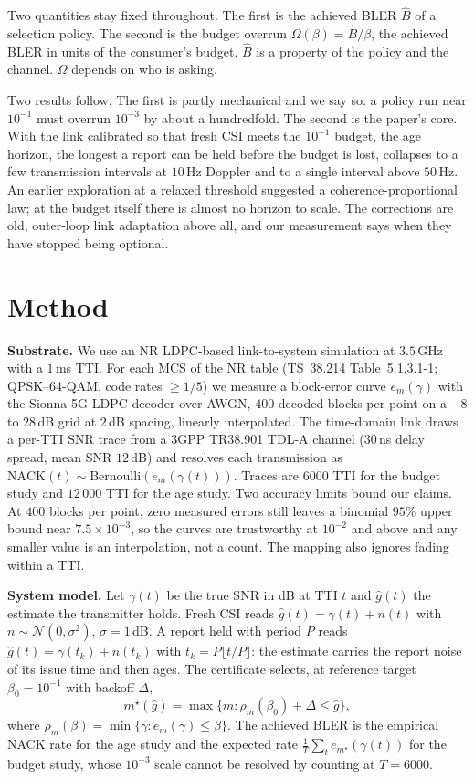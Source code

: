 \documentclass[conference]{IEEEtran}
\begin{document}
Two quantities stay fixed throughout. The first is the achieved BLER
$\widehat{B}$ of a selection policy. The second is the budget overrun
$\Omega(\beta)=\widehat{B}/\beta$, the achieved BLER in units of the consumer's
budget. $\widehat{B}$ is a property of the policy and the channel. $\Omega$
depends on who is asking.

Two results follow. The first is partly mechanical and we say so: a policy run
near $10^{-1}$ must overrun $10^{-3}$ by about a hundredfold. The second is the
paper's core. With the link calibrated so that fresh CSI meets the $10^{-1}$
budget, the age horizon, the longest a report can be held before the budget is
lost, collapses to a few transmission intervals at $10$\,Hz Doppler and to a
single interval above $50$\,Hz. An earlier exploration at a relaxed threshold
suggested a coherence-proportional law; at the budget itself there is almost no
horizon to scale. The corrections are old, outer-loop link adaptation above all,
and our measurement says when they have stopped being optional.

\section{Method}
\label{sec:method}
\textbf{Substrate.} We use an NR LDPC-based link-to-system simulation at
$3.5$\,GHz with a $1$\,ms TTI. For each MCS of the NR table (TS~38.214
Table~5.1.3.1-1; QPSK--64-QAM, code rates $\ge 1/5$) we measure a block-error
curve $e_m(\gamma)$ with the Sionna 5G LDPC decoder \cite{sionna} over AWGN,
$400$ decoded blocks per point on a $-8$ to $28$\,dB grid at $2$\,dB spacing,
linearly interpolated. The time-domain link draws a per-TTI SNR trace from a
3GPP TR38.901 TDL-A channel ($30$\,ns delay spread, mean SNR $12$\,dB) and
resolves each transmission as
$\mathrm{NACK}(t)\sim\mathrm{Bernoulli}(e_{m}(\gamma(t)))$. Traces are $6000$
TTI for the budget study and $12\,000$ TTI for the age study. Two accuracy
limits bound our claims. At $400$ blocks per point, zero measured errors still
leaves a binomial $95\%$ upper bound near $7.5\times10^{-3}$, so the curves are
trustworthy at $10^{-2}$ and above and any smaller value is an interpolation,
not a count. The mapping also ignores fading within a TTI.

\textbf{System model.} Let $\gamma(t)$ be the true SNR in dB at TTI $t$ and
$\hat{g}(t)$ the estimate the transmitter holds. Fresh CSI reads
$\hat{g}(t)=\gamma(t)+n(t)$ with $n\sim\mathcal{N}(0,\sigma^2)$,
$\sigma=1$\,dB. A report held with period $P$ reads
$\hat{g}(t)=\gamma(t_k)+n(t_k)$ with $t_k=P\lfloor t/P\rfloor$: the estimate
carries the report noise of its issue time and then ages. The certificate
selects, at reference target $\beta_0=10^{-1}$ with backoff $\Delta$,
\begin{equation}
m^\star(\hat{g})=\max\{m:\rho_m(\beta_0)+\Delta\le\hat{g}\},
\label{eq:cert}
\end{equation}
where $\rho_m(\beta)=\min\{\gamma:e_m(\gamma)\le\beta\}$. The achieved BLER is
the empirical NACK rate for the age study and the expected rate
$\tfrac{1}{T}\sum_t e_{m^\star}(\gamma(t))$ for the budget study, whose
$10^{-3}$ scale cannot be resolved by counting at $T{=}6000$.
\end{document}

